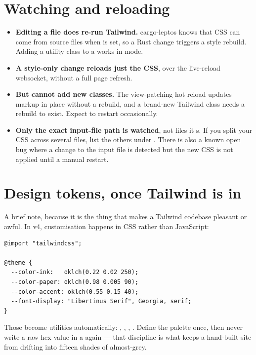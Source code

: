 \section{Watching and reloading}

\begin{itemize}
  \item \textbf{Editing a  file does re-run Tailwind.} cargo-leptos knows that CSS can
    come from source files when  is set, so a Rust change triggers a
    style rebuild. Adding a utility class to a  works in  mode.
  \item \textbf{A style-only change reloads just the CSS}, over the live-reload websocket, without
    a full page refresh.
  \item \textbf{But  cannot add new classes.} The view-patching hot reload
    updates markup in place without a rebuild, and a brand-new Tailwind class needs a rebuild to
    exist. Expect to restart occasionally.
  \item \textbf{Only the exact input-file path is watched}, not files it s. If you
    split your CSS across several files, list the others under .
    There is also a known open bug where a change to the input file is detected but the new CSS is
    not applied until a manual restart.
\end{itemize}

\section{Design tokens, once Tailwind is in}

A brief note, because it is the thing that makes a Tailwind codebase pleasant or awful. In v4,
customisation happens in CSS rather than JavaScript:

\begin{lstlisting}[style=sh,caption={\file{style/tailwind.css} --- tokens defined once, used everywhere.}]
@import "tailwindcss";

@theme {
  --color-ink:   oklch(0.22 0.02 250);
  --color-paper: oklch(0.98 0.005 90);
  --color-accent: oklch(0.55 0.15 40);
  --font-display: "Libertinus Serif", Georgia, serif;
}
\end{lstlisting}

Those become utilities automatically: , , ,
. Define the palette once, then never write a raw hex value in a 
again --- that discipline is what keeps a hand-built site from drifting into fifteen shades of
almost-grey.

